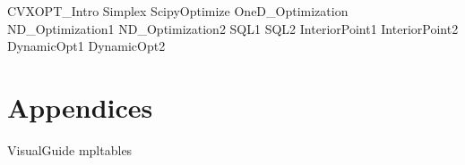 \documentclass[opener-c,labs,red,nociteref]{HJnewsiambook}
\begin{document}
{CVXOPT_Intro}
{Simplex}
{ScipyOptimize}
{OneD_Optimization}
{ND_Optimization1}
{ND_Optimization2}
{SQL1}
{SQL2}
{InteriorPoint1}
{InteriorPoint2}
{DynamicOpt1}
{DynamicOpt2}

\part{Appendices}
\begin{appendices}
{VisualGuide}
{mpltables}
\end{appendices}
\end{document}
